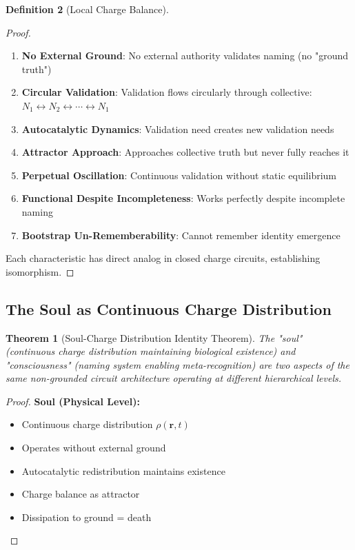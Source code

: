 \documentclass[12pt,a4paper]{article}
\theoremstyle{plain}
\newtheorem{theorem}{Theorem}[section]
\theoremstyle{definition}
\newtheorem{definition}[theorem]{Definition}
\theoremstyle{remark}
\begin{document}
\begin{definition}[Local Charge Balance]
\begin{proof}
\begin{enumerate}
\item \textbf{No External Ground}: No external authority validates naming (no "ground truth")
\item \textbf{Circular Validation}: Validation flows circularly through collective: $N_1 \leftrightarrow N_2 \leftrightarrow \cdots \leftrightarrow N_1$
\item \textbf{Autocatalytic Dynamics}: Validation need creates new validation needs
\item \textbf{Attractor Approach}: Approaches collective truth but never fully reaches it
\item \textbf{Perpetual Oscillation}: Continuous validation without static equilibrium
\item \textbf{Functional Despite Incompleteness}: Works perfectly despite incomplete naming
\item \textbf{Bootstrap Un-Rememberability}: Cannot remember identity emergence
\end{enumerate}

Each characteristic has direct analog in closed charge circuits, establishing isomorphism.
\end{proof}

\subsection{The Soul as Continuous Charge Distribution}

\begin{theorem}[Soul-Charge Distribution Identity Theorem]
The "soul" (continuous charge distribution maintaining biological existence) and "consciousness" (naming system enabling meta-recognition) are two aspects of the same non-grounded circuit architecture operating at different hierarchical levels.
\end{theorem}

\begin{proof}
\textbf{Soul (Physical Level):}
\begin{itemize}
\item Continuous charge distribution $\rho(\mathbf{r},t)$
\item Operates without external ground
\item Autocatalytic redistribution maintains existence
\item Charge balance as attractor
\item Dissipation to ground = death
\end{itemize}


\end{proof}
\end{definition}
\end{document}
